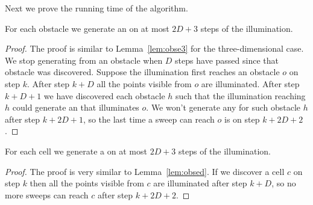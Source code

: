 \documentclass[english,gradu]{tktltiki2018}
\begin{document}
Next we prove the running time of the algorithm.

\begin{lem}\label{lem:obsed}For each obstacle we generate an \obsE on at most $2D+3$ steps of the illumination.\end{lem}
\begin{proof}
The proof is similar to Lemma~\ref{lem:obse3} for the three-dimensional case.
We stop generating \addEs from an obstacle when $D$ steps have passed since that obstacle was discovered.
Suppose the illumination first reaches an obstacle $o$ on step $k$.
After step $k+D$ all the points visible from $o$ are illuminated.
After step $k+D+1$ we have discovered each obstacle $h$ such that the illumination reaching $h$ could generate an \addE that illuminates $o$.
We won't generate any \addEs for such obstacle $h$ after step $k+2D+1$, so the last time a sweep can reach $o$ is on step $k+2D+2$.
\end{proof}

\begin{lem}\label{lem:celled}For each cell we generate a \cellE on at most $2D+3$ steps of the illumination.\end{lem}
\begin{proof}
The proof is very similar to Lemma~\ref{lem:obsed}.
If we discover a cell $c$ on step $k$ then all the points visible from $c$ are illuminated after step $k+D$, so no more sweeps can reach $c$ after step $k+2D+2$.
\end{proof}
\end{document}
